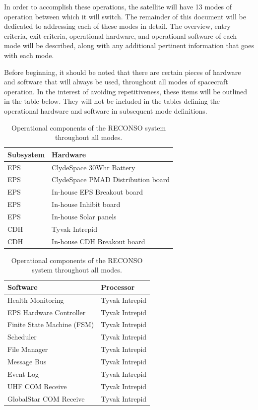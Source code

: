 \documentclass{article}
\begin{document}
\newpage

In order to accomplish these operations, the satellite will have 13 modes of operation between which it will switch. The remainder of this document will be dedicated to addressing each of these modes in detail. The overview, entry criteria, exit criteria, operational hardware, and operational software of each mode will be described, along with any additional pertinent information that goes with each mode.

Before beginning, it should be noted that there are certain pieces of hardware and software that will always be used, throughout all modes of spacecraft operation. In the interest of avoiding repetitiveness, these items will be outlined in the table below. They will not be included in the tables defining the operational hardware and software in subsequent mode definitions.

\begin{table}[h!]
\caption{Operational components of the RECONSO system throughout all modes.}
\begin{adjustbox}{center}
\begin{tabular}{|l|l|}
\hline
Subsystem & Hardware \\ \hline \hline
EPS & ClydeSpace 30Whr Battery \\ \hline
EPS & ClydeSpace PMAD Distribution board  \\ \hline
EPS & In-house EPS Breakout board \\ \hline
EPS & In-house Inhibit board  \\ \hline
EPS & In-house Solar panels  \\ \hline \hline
CDH & Tyvak Intrepid \\ \hline
CDH & In-house CDH Breakout board \\ \hline 
\end{tabular}

\quad

\begin{tabular}{|l|l|}
\hline
Software & Processor \\ \hline \hline
Health Monitoring & Tyvak Intrepid \\ \hline
EPS Hardware Controller & Tyvak Intrepid \\ \hline
Finite State Machine (FSM) & Tyvak Intrepid \\ \hline
Scheduler & Tyvak Intrepid \\ \hline
File Manager & Tyvak Intrepid \\ \hline
Message Bus & Tyvak Intrepid \\ \hline
Event Log & Tyvak Intrepid \\ \hline
UHF COM Receive & Tyvak Intrepid \\ \hline
GlobalStar COM Receive & Tyvak Intrepid \\ \hline
\end{tabular}
\end{adjustbox}
\end{table}
\end{document}

